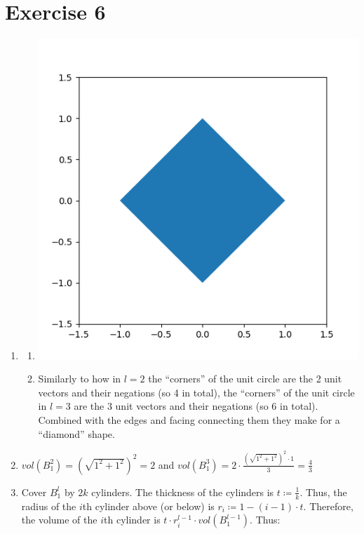 \documentclass[12pt]{article}
\begin{document}
\section*{Exercise 6}
\begin{enumerate}[label=(\alph*)]
	\item	\begin{enumerate}[label=(\roman*)]
				\item	\includegraphics{code/exercise_06_a.png}
				\item	Similarly to how in $l=2$ the ``corners'' of the unit circle are the 2 unit vectors and their negations (so 4 in total), the ``corners'' of the unit circle in $l=3$ are the 3 unit vectors and their negations (so 6 in total). Combined with the edges and facing connecting them they make for a ``diamond'' shape.
			\end{enumerate}
	\item	$vol(B_1^2) = (\sqrt{1^2+1^2})^2 = 2$ and $vol(B_1^3) = 2 \cdot \frac{(\sqrt{1^2+1^2})^2 \cdot 1}{3} = \frac{4}{3}$
	\item	Cover $B_1^l$ by $2k$ cylinders. The thickness of the cylinders is $t \coloneqq \frac{1}{k}$. Thus, the radius of the $i$th cylinder above (or below) is $r_i \coloneqq 1 - (i-1) \cdot t$. Therefore, the volume of the $i$th cylinder is $t \cdot r_i^{l-1} \cdot vol(B_1^{l-1})$. Thus:
			\begin{align*}

\end{align*}
\end{enumerate}
\end{document}
